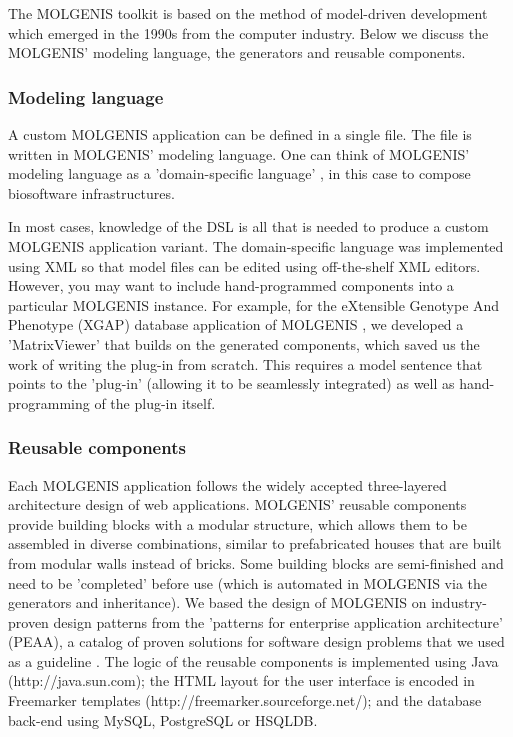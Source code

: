 The MOLGENIS toolkit is based on the method of model-driven development which emerged in the 1990s 
from the computer industry. Below we discuss the MOLGENIS' modeling language, the generators and 
reusable components. 

\subsubsection{Modeling language}
A custom MOLGENIS application can be defined in a single file. The file is written in MOLGENIS' 
modeling language. One can think of MOLGENIS' modeling language as a 'domain-specific language' 
\cite{Deursen:2002}, in this case to compose biosoftware infrastructures.

In most cases, knowledge of the DSL is all that is needed to produce a custom MOLGENIS application 
variant. The domain-specific language was implemented using XML so that model files can be edited 
using off-the-shelf XML editors. However, you may want to include hand-programmed components into 
a particular MOLGENIS instance. For example, for the eXtensible Genotype And Phenotype (XGAP) 
database application of MOLGENIS \cite{Swertz:2010a}, we developed a 'MatrixViewer' that builds on the generated 
components, which saved us the work of writing the plug-in from scratch. This requires a model 
sentence that points to the 'plug-in' (allowing it to be seamlessly integrated) as well as 
hand-programming of the plug-in itself.

\subsubsection{Reusable components}
Each MOLGENIS application follows the widely accepted three-layered architecture design of web 
applications. MOLGENIS' reusable components provide building blocks with a modular structure, which 
allows them to be assembled in diverse combinations, similar to prefabricated houses that are built 
from modular walls instead of bricks. Some building blocks are semi-finished and need to be 
'completed' before use (which is automated in MOLGENIS via the generators and inheritance). We based 
the design of MOLGENIS on industry-proven design patterns from the 'patterns for enterprise 
application architecture' (PEAA), a catalog of proven solutions for software design problems 
that we used as a guideline \cite{Fowler:2002}. The logic of the reusable components is implemented using 
Java (http://java.sun.com); the HTML layout for the user interface is encoded in Freemarker 
templates (http://freemarker.sourceforge.net/); and the database back-end using MySQL, PostgreSQL 
or HSQLDB.

